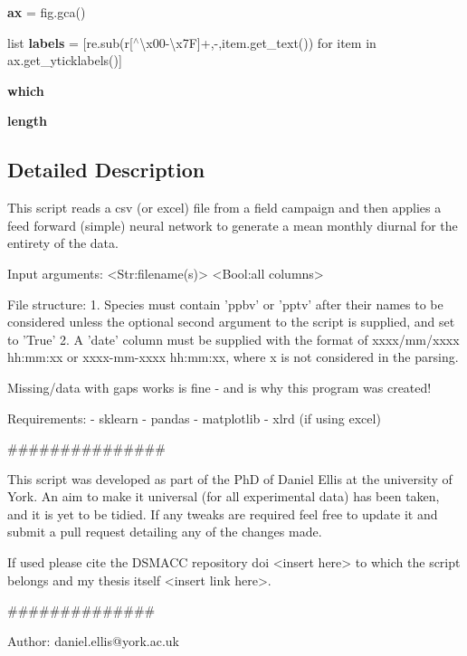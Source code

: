 \begin{DoxyCompactItemize}
{\bfseries ax} = fig.\+gca()
\item 
\mbox{\label{namespacedsmacc_1_1observations_1_1get__diurnal_a2732ed80fc1377f1352c4437a2f64a88}} 
list {\bfseries labels} = \mbox{[}re.\+sub(r\textquotesingle{}\mbox{[}$^\wedge$\textbackslash{}x00-\/\textbackslash{}x7F\mbox{]}+\textquotesingle{},\textquotesingle{}-\/\textquotesingle{},item.\+get\+\_\+text()) for item in ax.\+get\+\_\+yticklabels()\mbox{]}
\item 
\mbox{\label{namespacedsmacc_1_1observations_1_1get__diurnal_a0bb476aaf3c7a4fca0d7b22dd6ad6abb}} 
{\bfseries which}
\item 
\mbox{\label{namespacedsmacc_1_1observations_1_1get__diurnal_a80cf8dbff1fdd8f2fb3c62b06a163010}} 
{\bfseries length}
\end{DoxyCompactItemize}


\subsection{Detailed Description}
\begin{DoxyVerb}This script reads a csv (or excel) file from a field campaign and then applies a feed forward (simple) neural network to generate a mean monthly diurnal for the entirety of the data. 

Input arguments: <Str:filename(s)> <Bool:all columns>

File structure:
 1. Species must contain 'ppbv' or 'pptv' after their names to be considered unless the optional second argument to the script is supplied, and set to 'True'
 2. A 'date' column must be supplied with the format of xxxx/mm/xxxx hh:mm:xx or 
xxxx-mm-xxxx hh:mm:xx, where x is not considered in the parsing. 

Missing/data with gaps works is fine - and is why this program was created!

Requirements:
- sklearn
- pandas
- matplotlib
- xlrd (if using excel)

###############

This script was developed as part of the PhD of Daniel Ellis at the university of York. An aim to make it universal (for all experimental data) has been taken, and it is yet to be tidied. If any tweaks are required feel free to update it and submit a pull request detailing any of the changes made. 

If used please cite the DSMACC repository doi <insert here> to which the script belongs and my thesis itself <insert link here>. 

##############

Author: daniel.ellis@york.ac.uk\end{DoxyVerb}
 

